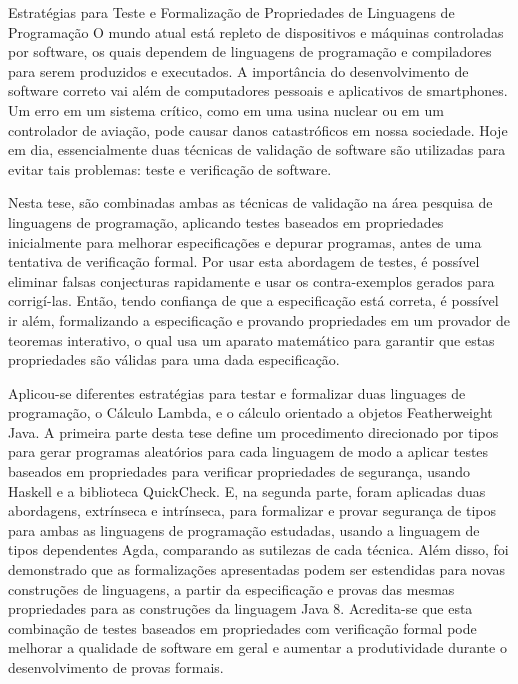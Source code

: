 \documentclass[tese,capa,english]{texufpel}
\begin{document}
\begin{englishabstract}{Estrat\'{e}gias para Teste e Formaliza\c{c}\~{a}o de Propriedades de Linguagens de Programa\c{c}\~{a}o}
O mundo atual est\'{a} repleto de dispositivos e m\'{a}quinas controladas por software, os quais dependem de linguagens de programa\c{c}\~{a}o e compiladores para serem produzidos e executados. A import\^{a}ncia do desenvolvimento de software correto vai al\'{e}m de computadores pessoais e aplicativos de smartphones. Um erro em um sistema cr\'{i}tico, como em uma usina nuclear ou em um controlador de avia\c{c}\~{a}o, pode causar danos catastr\'{o}ficos em nossa sociedade. Hoje em dia, essencialmente duas t\'{e}cnicas de valida\c{c}\~{a}o de software s\~{a}o utilizadas para evitar tais problemas: teste e verifica\c{c}\~{a}o de software. 

Nesta tese, s\~{a}o combinadas ambas as t\'{e}cnicas de valida\c{c}\~{a}o na \'{a}rea pesquisa de linguagens de programa\c{c}\~{a}o, aplicando testes baseados em propriedades inicialmente para melhorar especifica\c{c}\~{o}es e depurar programas, antes de uma tentativa de verifica\c{c}\~{a}o formal. Por usar esta abordagem de testes, \'{e} poss\'{i}vel eliminar falsas conjecturas rapidamente e usar os contra-exemplos gerados para corrig\'{i}-las. Ent\~{a}o, tendo confian\c{c}a de que a especifica\c{c}\~{a}o est\'{a} correta, \'{e} poss\'{i}vel ir al\'{e}m, formalizando a especifica\c{c}\~{a}o e provando propriedades em um provador de teoremas interativo, o qual usa um aparato matem\'{a}tico para garantir que estas propriedades s\~{a}o v\'{a}lidas para uma dada especifica\c{c}\~{a}o.

Aplicou-se diferentes estrat\'{e}gias para testar e formalizar duas linguages de programa\c{c}\~{a}o, o C\'{a}lculo Lambda, e o c\'{a}lculo orientado a objetos Featherweight Java. A primeira parte desta tese define um procedimento direcionado por tipos para gerar programas aleat\'{o}rios para cada linguagem de modo a aplicar testes baseados em propriedades para verificar propriedades de seguran\c{c}a, usando Haskell e a biblioteca QuickCheck. E, na segunda parte, foram aplicadas duas abordagens, extr\'{i}nseca e intr\'{i}nseca, para formalizar e provar seguran\c{c}a de tipos para ambas as linguagens de programa\c{c}\~{a}o estudadas, usando a linguagem de tipos dependentes Agda, comparando as sutilezas de cada t\'{e}cnica. Al\'{e}m disso, foi demonstrado que as formaliza\c{c}\~{o}es apresentadas podem ser estendidas para novas constru\c{c}\~{o}es de linguagens, a partir da especifica\c{c}\~{a}o e provas das mesmas propriedades para as constru\c{c}\~{o}es da linguagem Java 8. Acredita-se que esta combina\c{c}\~{a}o de testes baseados em propriedades com verifica\c{c}\~{a}o formal pode melhorar a qualidade de software em geral e aumentar a produtividade durante o desenvolvimento de provas formais.
  
\end{englishabstract}
\end{document}
